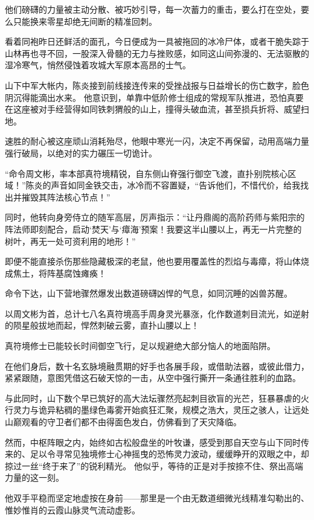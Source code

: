 他们磅礴的力量被主动分散、被巧妙引导，每一次蓄力的重击，要么打在空处，要么只能换来零星却绝无间断的精准回刺。

看着同袍昨日还鲜活的面孔，今日便成为一具被拖回的冰冷尸体，或者干脆失踪于山林再也寻不回，一股深入骨髓的无力与挫败感，如同这山间弥漫的、无法驱散的湿冷寒气，悄然侵蚀着攻城大军原本高昂的士气。

\vspace{2em}

山下中军大帐内，陈炎接到前线接连传来的受挫战报与日益增长的伤亡数字，脸色阴沉得能滴出水来。 他意识到，单靠中低阶修士组成的常规军队推进，恐怕真要在这座被对手经营得如同铁刺猬般的山上，撞得头破血流，甚至损兵折将、威望扫地。

速胜的耐心被这座顽山消耗殆尽，他眼中寒光一闪，决定不再保留，动用高端力量强行破局，以绝对的实力碾压一切诡计。

“命令周文彬，率本部真符境精锐，自东侧山脊强行御空飞渡，直扑别院核心区域！”陈炎的声音如同金铁交击，冰冷而不容置疑，“告诉他们，不惜代价，给我找出并摧毁其阵法核心节点！”

同时，他转向身旁侍立的随军高层，厉声指示：“让丹鼎阁的高阶药师与紫阳宗的阵法师即刻配合，启动‘焚天’与‘瘴海’预案！我要这半山腰以上，再无一片完整的树叶，再无一处可资利用的地形！”

即便不能直接杀伤那些隐藏极深的老鼠，他也要用覆盖性的烈焰与毒瘴，将山体烧成焦土，将阵基腐蚀瘫痪！

命令下达，山下营地骤然爆发出数道磅礴凶悍的气息，如同沉睡的凶兽苏醒。

以周文彬为首，总计七八名真符境高手周身灵光暴涨，化作数道刺目流光，如逆射的陨星般拔地而起，悍然刺破云雾，直扑山腰以上！

真符境修士已能较长时间御空飞行，足以规避绝大部分恼人的地面陷阱。

在他们身后，数十名玄脉境融贯期的好手也各展手段，或借助法器，或彼此借力，紧紧跟随，意图凭借这石破天惊的一击，从空中强行撕开一条通往胜利的血路。

与此同时，山下数个早已筑好的高大法坛骤然亮起刺目欲盲的光芒，狂暴暴虐的火行灵力与诡异粘稠的墨绿色毒雾开始疯狂汇聚，规模之浩大，灵压之骇人，让远处山巅观看的守卫者们都不由得面色发白，仿佛看到了天灾降临。

然而，中枢阵眼之内，始终如古松般盘坐的叶牧谦，感受到那自天空与山下同时传来的、足以令寻常见独境修士心神摇曳的恐怖灵力波动，缓缓睁开的双眼之中，却掠过一丝“终于来了”的锐利精光。 他似乎，等待的正是对手按捺不住、祭出高端力量的这一刻。

他双手平稳而坚定地虚按在身前——那里是一个由无数道细微光线精准勾勒出的、惟妙惟肖的云霞山脉灵气流动虚影。

